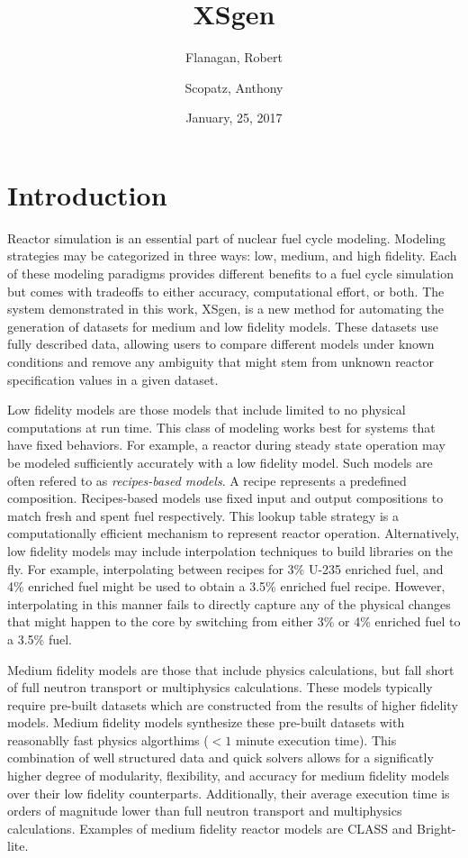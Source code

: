 \documentclass{article}
\begin{document}
\title{XSgen}
\date{January, 25, 2017}
\author{Flanagan, Robert \and Scopatz, Anthony}
\maketitle
\onehalfspacing

\section{Introduction}

Reactor simulation is an essential part of nuclear fuel cycle modeling. Modeling strategies
may be categorized in three ways: low, medium, and high fidelity. Each of these modeling
paradigms provides different benefits to a fuel cycle simulation but comes with tradeoffs to
either accuracy, computational effort, or both. The system demonstrated in this work, XSgen, 
is a new method for automating the generation of datasets for medium and low fidelity models. 
These datasets use fully described data, allowing users to compare different models under known
conditions and remove any ambiguity that might stem from unknown reactor specification values in a 
given dataset. 

Low fidelity models are those models that include limited to no physical computations at run time.
This class of modeling works best for systems that have fixed behaviors. For example, a reactor
during steady state operation may be modeled sufficiently accurately with a low fidelity model.
Such models are often refered to as \emph{recipes-based models}. A recipe represents a predefined
composition. Recipes-based models use fixed input and output compositions to
match fresh and spent
fuel respectively. This lookup table strategy is a computationally efficient mechanism to
represent reactor operation. Alternatively, low fidelity models may include interpolation
techniques to build libraries on the fly. For example, interpolating between recipes for
3\% U-235 enriched fuel, and 4\% enriched fuel might be used to obtain a 3.5\% enriched
fuel recipe.
However, interpolating in this manner fails to directly capture any of the physical changes
that might happen to the core by switching from either 3\% or 4\% enriched fuel to a 3.5\% fuel.

Medium fidelity models are those that include physics calculations, but fall short of
full neutron transport or multiphysics calculations. These models typically require
pre-built datasets which are constructed from the results of higher fidelity models.
Medium fidelity models synthesize these pre-built datasets with reasonablly fast physics
algorthims ($<1$ minute execution time). This combination of well structured data and
quick solvers allows for a significatly higher degree of modularity, flexibility, and accuracy
for medium fidelity models over their low fidelity counterparts. Additionally, their average
execution time is orders of magnitude lower than full neutron transport and multiphysics
calculations. Examples of medium fidelity reactor models are CLASS\cite{class}
and Bright-lite\cite{brightlite,flanagan}.
\end{document}

